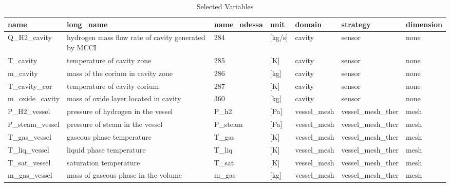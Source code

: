 \begin{table}
\caption{Selected Variables}
\label{tab:variables}
\begin{tabular}{lllllll}
\toprule
name & long_name & name_odessa & unit & domain & strategy & dimension \\
\midrule
Q_H2_cavity & hydrogen mass flow rate of cavity generated by MCCI & 284 & [kg/s] & cavity & sensor & none \\
T_cavity & temperature of cavity zone & 285 & [K] & cavity & sensor & none \\
m_cavity & mass of the corium in cavity zone & 286 & [kg] & cavity & sensor & none \\
T_cavity_cor & temperature of cavity corium & 287 & [K] & cavity & sensor & none \\
m_oxide_cavity & mass of oxide layer located in cavity & 360 & [kg] & cavity & sensor & none \\
P_H2_vessel & pressure of hydrogen in the vessel & P_h2 & [Pa] & vessel_mesh & vessel_mesh_ther & mesh \\
P_steam_vessel & pressure of steam in the vessel & P_steam & [Pa] & vessel_mesh & vessel_mesh_ther & mesh \\
T_gas_vessel & gaseous phase temperature & T_gas & [K] & vessel_mesh & vessel_mesh_ther & mesh \\
T_liq_vessel & liquid phase temperature & T_liq & [K] & vessel_mesh & vessel_mesh_ther & mesh \\
T_sat_vessel & saturation temperature & T_sat & [K] & vessel_mesh & vessel_mesh_ther & mesh \\
m_gas_vessel & mass of gaseous phase in the volume & m_gas & [kg] & vessel_mesh & vessel_mesh_ther & mesh \\
\bottomrule
\end{tabular}
\end{table}
